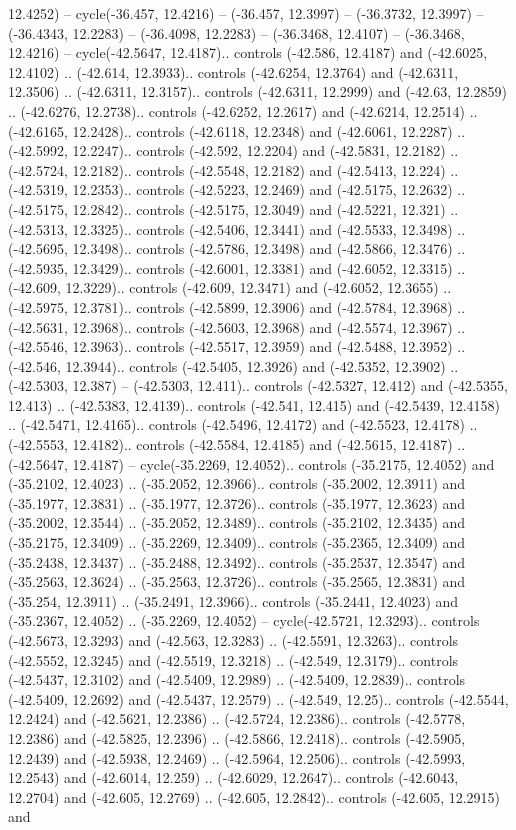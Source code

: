 \begin{scope}[shift={(2.5552, 9.9912)}]
\begin{scope}[shift={(48.1654, -14.8546)}]
12.4252) -- cycle(-36.457, 12.4216) -- (-36.457, 12.3997) -- (-36.3732, 12.3997) -- (-36.4343, 12.2283) -- (-36.4098, 12.2283) -- (-36.3468, 12.4107) -- (-36.3468, 12.4216) -- cycle(-42.5647, 12.4187).. controls (-42.586, 12.4187) and (-42.6025, 12.4102) .. (-42.614, 12.3933).. controls (-42.6254, 12.3764) and (-42.6311, 12.3506) .. (-42.6311, 12.3157).. controls (-42.6311, 12.2999) and (-42.63, 12.2859) .. (-42.6276, 12.2738).. controls (-42.6252, 12.2617) and (-42.6214, 12.2514) .. (-42.6165, 12.2428).. controls (-42.6118, 12.2348) and (-42.6061, 12.2287) .. (-42.5992, 12.2247).. controls (-42.592, 12.2204) and (-42.5831, 12.2182) .. (-42.5724, 12.2182).. controls (-42.5548, 12.2182) and (-42.5413, 12.224) .. (-42.5319, 12.2353).. controls (-42.5223, 12.2469) and (-42.5175, 12.2632) .. (-42.5175, 12.2842).. controls (-42.5175, 12.3049) and (-42.5221, 12.321) .. (-42.5313, 12.3325).. controls (-42.5406, 12.3441) and (-42.5533, 12.3498) .. (-42.5695, 12.3498).. controls (-42.5786, 12.3498) and (-42.5866, 12.3476) .. (-42.5935, 12.3429).. controls (-42.6001, 12.3381) and (-42.6052, 12.3315) .. (-42.609, 12.3229).. controls (-42.609, 12.3471) and (-42.6052, 12.3655) .. (-42.5975, 12.3781).. controls (-42.5899, 12.3906) and (-42.5784, 12.3968) .. (-42.5631, 12.3968).. controls (-42.5603, 12.3968) and (-42.5574, 12.3967) .. (-42.5546, 12.3963).. controls (-42.5517, 12.3959) and (-42.5488, 12.3952) .. (-42.546, 12.3944).. controls (-42.5405, 12.3926) and (-42.5352, 12.3902) .. (-42.5303, 12.387) -- (-42.5303, 12.411).. controls (-42.5327, 12.412) and (-42.5355, 12.413) .. (-42.5383, 12.4139).. controls (-42.541, 12.415) and (-42.5439, 12.4158) .. (-42.5471, 12.4165).. controls (-42.5496, 12.4172) and (-42.5523, 12.4178) .. (-42.5553, 12.4182).. controls (-42.5584, 12.4185) and (-42.5615, 12.4187) .. (-42.5647, 12.4187) -- cycle(-35.2269, 12.4052).. controls (-35.2175, 12.4052) and (-35.2102, 12.4023) .. (-35.2052, 12.3966).. controls (-35.2002, 12.3911) and (-35.1977, 12.3831) .. (-35.1977, 12.3726).. controls (-35.1977, 12.3623) and (-35.2002, 12.3544) .. (-35.2052, 12.3489).. controls (-35.2102, 12.3435) and (-35.2175, 12.3409) .. (-35.2269, 12.3409).. controls (-35.2365, 12.3409) and (-35.2438, 12.3437) .. (-35.2488, 12.3492).. controls (-35.2537, 12.3547) and (-35.2563, 12.3624) .. (-35.2563, 12.3726).. controls (-35.2565, 12.3831) and (-35.254, 12.3911) .. (-35.2491, 12.3966).. controls (-35.2441, 12.4023) and (-35.2367, 12.4052) .. (-35.2269, 12.4052) -- cycle(-42.5721, 12.3293).. controls (-42.5673, 12.3293) and (-42.563, 12.3283) .. (-42.5591, 12.3263).. controls (-42.5552, 12.3245) and (-42.5519, 12.3218) .. (-42.549, 12.3179).. controls (-42.5437, 12.3102) and (-42.5409, 12.2989) .. (-42.5409, 12.2839).. controls (-42.5409, 12.2692) and (-42.5437, 12.2579) .. (-42.549, 12.25).. controls (-42.5544, 12.2424) and (-42.5621, 12.2386) .. (-42.5724, 12.2386).. controls (-42.5778, 12.2386) and (-42.5825, 12.2396) .. (-42.5866, 12.2418).. controls (-42.5905, 12.2439) and (-42.5938, 12.2469) .. (-42.5964, 12.2506).. controls (-42.5993, 12.2543) and (-42.6014, 12.259) .. (-42.6029, 12.2647).. controls (-42.6043, 12.2704) and (-42.605, 12.2769) .. (-42.605, 12.2842).. controls (-42.605, 12.2915) and 
\end{scope}
\end{scope}
